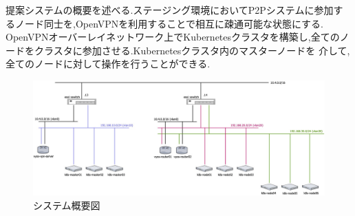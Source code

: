提案システムの概要を述べる.ステージング環境においてP2Pシステムに参加するノード同士を,OpenVPNを利用することで相互に疎通可能な状態にする.
OpenVPNオーバーレイネットワーク上でKubernetesクラスタを構築し,全てのノードをクラスタに参加させる.Kubernetesクラスタ内のマスターノードを
介して,全てのノードに対して操作を行うことができる.

\begin{figure}[htbp]
  \begin{center}
    \includegraphics[width=\textwidth]{./figures/system-diagram.jpg}
    \caption{システム概要図}
  \end{center}
\end{figure}


